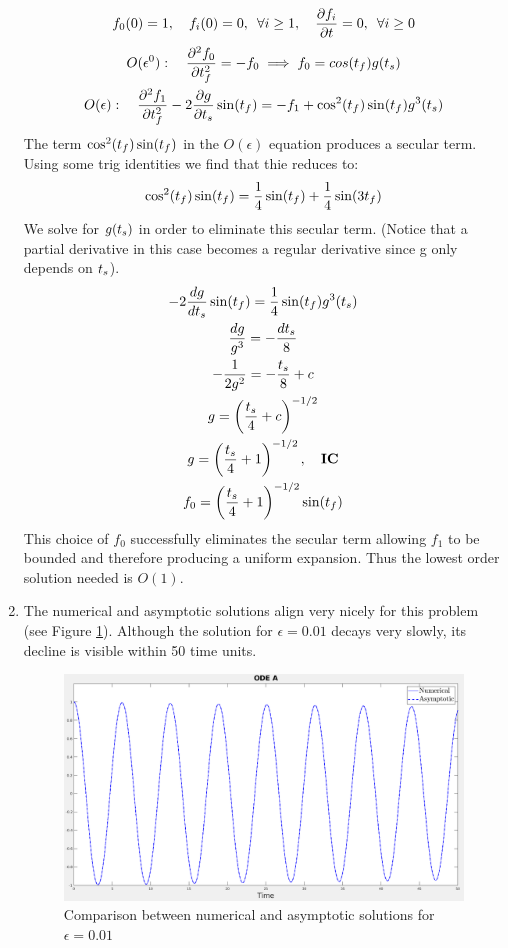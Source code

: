 \documentclass{article}
\begin{document}
\begin{enumerate}[label=\alph*.]
\begin{gather*}
        f_0 (0) = 1, \quad f_i(0) = 0, \enspace \forall i \ge 1, \quad \frac{\partial f_i}{\partial t} =
        0, \enspace
        \forall i \ge 0
    \end{gather*}
    \begin{gather*}
        O(\epsilon^0): \quad \frac{\partial^2f_0}{\partial t_f^2} = -f_0
        \implies f_0 = cos(t_f)g(t_s)\\
        O(\epsilon): \quad \frac{\partial^2f_1}{\partial t_f^2}
        -2\frac{\partial g}{\partial t_s}\sin(t_f) = -f_1 + \cos^2(t_f)\sin(t_f)g^3(t_s)
    \end{gather*}
    The term $\cos^2(t_f)\sin(t_f)$ in the $O(\epsilon)$ equation produces a
    secular term. Using some trig identities we find that thie reduces to:
    \begin{gather*}
        \cos^2(t_f)\sin(t_f) = \frac{1}{4}\sin(t_f) + \frac{1}{4}\sin(3t_f)
    \end{gather*}
    We solve for $g(t_s)$ in order to eliminate this secular term. (Notice that
    a partial derivative in this case becomes a regular derivative since g only
    depends on $t_s$). 
    \begin{gather*}
        -2\frac{dg}{dt_s}\sin(t_f) = \frac{1}{4}\sin(t_f)g^3(t_s)\\
        \frac{dg}{g^3} = -\frac{dt_s}{8}\\
        -\frac{1}{2g^2} = -\frac{t_s}{8} + c\\
        g = \left(\frac{t_s}{4} + c\right)^{-1/2}\\
        g = \left(\frac{t_s}{4} + 1\right)^{-1/2}, \quad \textbf{IC}\\
        f_0 = \left(\frac{t_s}{4} + 1\right)^{-1/2}\sin(t_f)
    \end{gather*}
    This choice of $f_0$ successfully eliminates the secular term allowing $f_1$
    to be bounded and therefore producing a uniform expansion. Thus the lowest
    order solution needed is $O(1)$. 
    \item The numerical and asymptotic solutions align very nicely for this
    problem (see Figure \ref{fig:ODEA_comp}). Although the solution for
    $\epsilon = 0.01$ decays very slowly, its decline is visible within 50 time
    units. 
        \begin{figure}[ht]
            \centering
            \includegraphics[width=.8\textwidth]{images/ODEA_sol.png}
            \caption{Comparison between numerical and asymptotic solutions for
            $\epsilon = 0.01$}
            \label{fig:ODEA_comp}
        \end{figure}
    

\end{enumerate}
\end{document}
